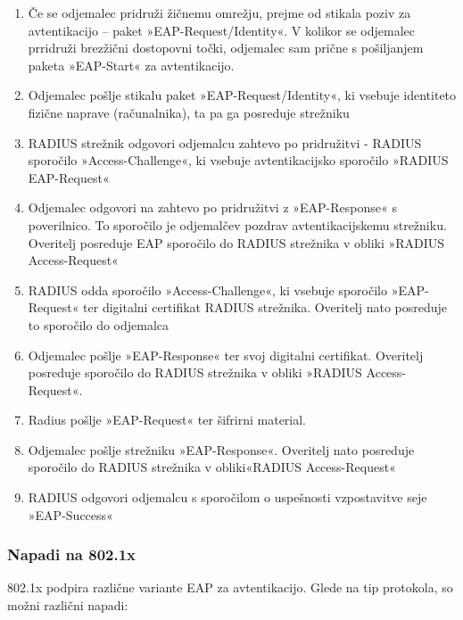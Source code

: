 \documentclass[12pt]{article}
\begin{document}
\begin{enumerate}
    \item Če se odjemalec pridruži žičnemu omrežju, prejme od stikala poziv za avtentikacijo – paket »EAP-Request/Identity«. V kolikor se odjemalec prridruži brezžični dostopovni točki, odjemalec sam prične s pošiljanjem paketa »EAP-Start« za avtentikacijo.
    \item Odjemalec pošlje stikalu paket »EAP-Request/Identity«, ki vsebuje identiteto fizične naprave (računalnika), ta pa ga posreduje strežniku
    \item RADIUS strežnik odgovori odjemalcu zahtevo po pridružitvi - RADIUS sporočilo »Access-Challenge«, ki vsebuje avtentikacijsko sporočilo »RADIUS EAP-Request«
    \item Odjemalec odgovori na zahtevo po pridružitvi z »EAP-Response« s poverilnico. To sporočilo je odjemalčev pozdrav avtentikacijskemu strežniku. Overitelj posreduje EAP sporočilo do RADIUS strežnika v obliki »RADIUS Access-Request«
    \item RADIUS odda sporočilo »Access-Challenge«, ki vsebuje sporočilo »EAP-Request« ter digitalni certifikat RADIUS strežnika. Overitelj nato posreduje to sporočilo do odjemalca
    \item Odjemalec pošlje »EAP-Response« ter svoj digitalni certifikat. Overitelj posreduje sporočilo do RADIUS strežnika v obliki »RADIUS Access-Request«.
    \item Radius pošlje »EAP-Request« ter šifrirni material.
    \item Odjemalec pošlje strežniku »EAP-Response«. Overitelj nato posreduje sporočilo do RADIUS strežnika v obliki«RADIUS Access-Request«
    \item RADIUS odgovori odjemalcu s sporočilom o uspešnosti vzpostavitve seje »EAP-Success«
\end{enumerate}

\subsubsection{Napadi na 802.1x}

802.1x podpira različne variante EAP za avtentikacijo. Glede na tip protokola, so možni različni napadi:
\end{document}
